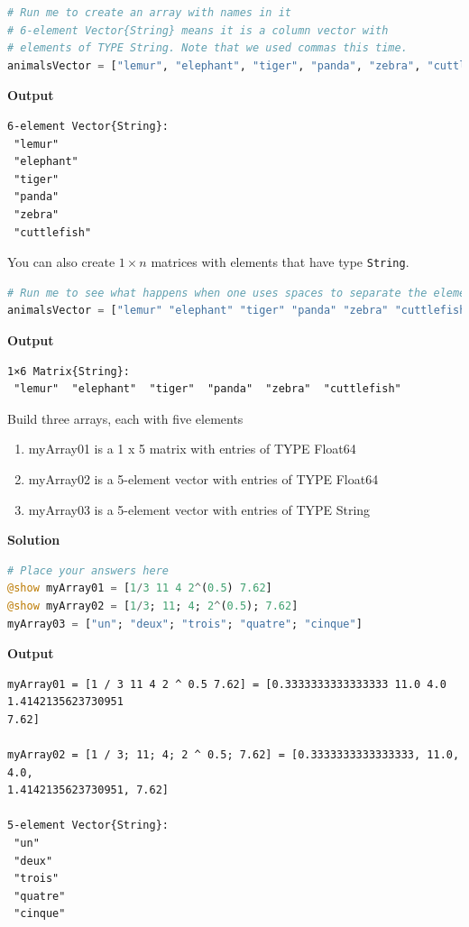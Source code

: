 \begin{lstlisting}[language=Julia,style=mystyle]
# Run me to create an array with names in it
# 6-element Vector{String} means it is a column vector with 
# elements of TYPE String. Note that we used commas this time.
animalsVector = ["lemur", "elephant", "tiger", "panda", "zebra", "cuttlefish"]
\end{lstlisting}
\textbf{Output} 
\begin{verbatim}
6-element Vector{String}:
 "lemur"
 "elephant"
 "tiger"
 "panda"
 "zebra"
 "cuttlefish"
\end{verbatim}

You can also create $1 \times n$ matrices with elements that have type \texttt{String}.

\begin{lstlisting}[language=Julia,style=mystyle]
# Run me to see what happens when one uses spaces to separate the elements
animalsVector = ["lemur" "elephant" "tiger" "panda" "zebra" "cuttlefish"]
\end{lstlisting}
\textbf{Output} 
\begin{verbatim}
1×6 Matrix{String}:
 "lemur"  "elephant"  "tiger"  "panda"  "zebra"  "cuttlefish"
\end{verbatim}

\begin{exercise}
Build three arrays, each with five elements
\begin{enumerate}
    \item myArray01 is a 1 x 5 matrix with entries of TYPE Float64
    \item myArray02 is a 5-element vector with entries of TYPE Float64
    \item myArray03 is a 5-element vector with entries of TYPE String
\end{enumerate}
\end{exercise}
\textbf{Solution}


\begin{lstlisting}[language=Julia,style=mystyle]
# Place your answers here
@show myArray01 = [1/3 11 4 2^(0.5) 7.62]
@show myArray02 = [1/3; 11; 4; 2^(0.5); 7.62]
myArray03 = ["un"; "deux"; "trois"; "quatre"; "cinque"]
\end{lstlisting}
\textbf{Output} 
\begin{verbatim}
myArray01 = [1 / 3 11 4 2 ^ 0.5 7.62] = [0.3333333333333333 11.0 4.0 1.4142135623730951 
7.62]

myArray02 = [1 / 3; 11; 4; 2 ^ 0.5; 7.62] = [0.3333333333333333, 11.0, 4.0, 
1.4142135623730951, 7.62]

5-element Vector{String}:
 "un"
 "deux"
 "trois"
 "quatre"
 "cinque"
\end{verbatim}

